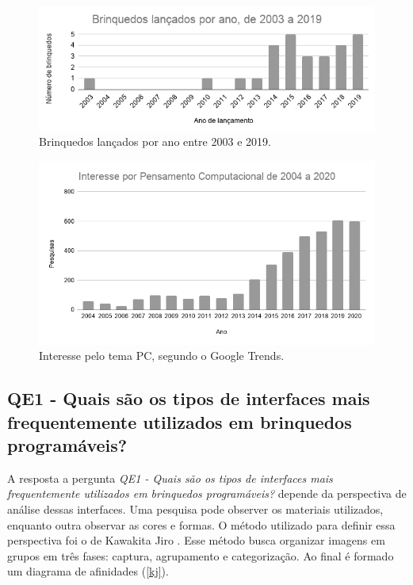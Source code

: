 \begin{figure}[!htbp]
    \centering
    \includegraphics[width=.8\linewidth,fbox]{figs/brinquedos_ano.png}
    \caption{Brinquedos lançados por ano entre 2003 e 2019.}
    \label{toys_year}
    \sourceauthor
\end{figure}

\begin{figure}[!htbp]
    \centering
    \includegraphics[width=.8\linewidth,fbox]{figs/pc_interest.png}
    \caption{Interesse pelo tema \acl{PC}, segundo o Google Trends.}
    \label{pc_interest}
    \sourceauthor
\end{figure}

\subsection{QE1 - Quais são os tipos de interfaces mais frequentemente utilizados em brinquedos programáveis?}

A resposta a pergunta \textit{QE1 - Quais são os tipos de interfaces mais frequentemente utilizados em brinquedos programáveis?} depende da perspectiva de análise dessas interfaces. Uma pesquisa pode observer os materiais utilizados, enquanto outra observar as cores e formas. O método utilizado para definir essa perspectiva foi o de Kawakita Jiro . Esse método busca organizar imagens em grupos em três fases: captura, agrupamento e categorização. Ao final é formado um diagrama de afinidades (\autoref{kj}).

